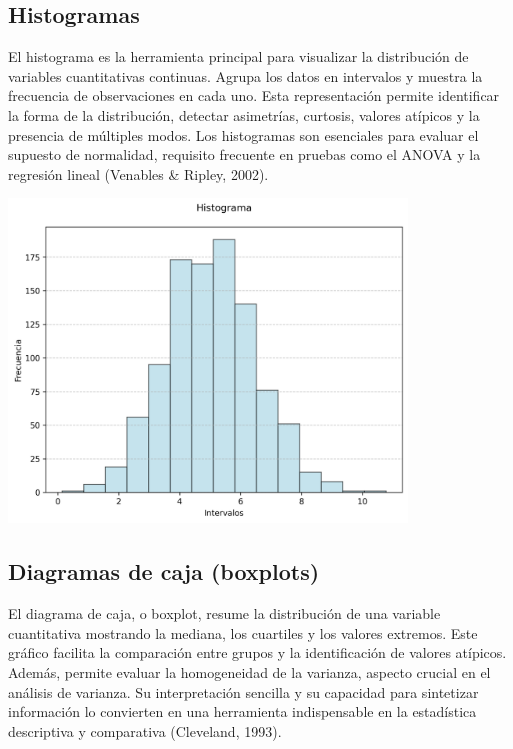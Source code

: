 \documentclass[
  spanish,
  a4paper,
  DIV=11,
  numbers=noendperiod,
  onepage,
  openany]{scrreprt}
\begin{document}
\subsection{Histogramas}\label{histogramas}

El histograma es la herramienta principal para visualizar la
distribución de variables cuantitativas continuas. Agrupa los datos en
intervalos y muestra la frecuencia de observaciones en cada uno. Esta
representación permite identificar la forma de la distribución, detectar
asimetrías, curtosis, valores atípicos y la presencia de múltiples
modos. Los histogramas son esenciales para evaluar el supuesto de
normalidad, requisito frecuente en pruebas como el ANOVA y la regresión
lineal (Venables \& Ripley, 2002).

\begin{center}
\includegraphics[width=4.16667in,height=\textheight,keepaspectratio]{images/histograma.png}
\end{center}

\subsection{Diagramas de caja
(boxplots)}\label{diagramas-de-caja-boxplots}

El diagrama de caja, o boxplot, resume la distribución de una variable
cuantitativa mostrando la mediana, los cuartiles y los valores extremos.
Este gráfico facilita la comparación entre grupos y la identificación de
valores atípicos. Además, permite evaluar la homogeneidad de la
varianza, aspecto crucial en el análisis de varianza. Su interpretación
sencilla y su capacidad para sintetizar información lo convierten en una
herramienta indispensable en la estadística descriptiva y comparativa
(Cleveland, 1993).
\end{document}
